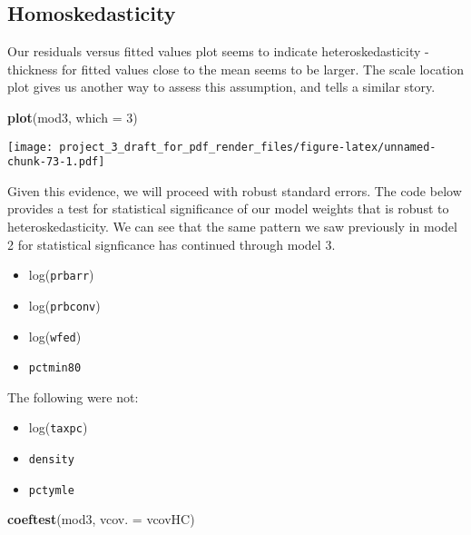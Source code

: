 \documentclass[]{article}
\newenvironment{Shaded}{\begin{snugshade}}{\end{snugshade}}
\newcommand{\DataTypeTok}[1]{\textcolor[rgb]{0.13,0.29,0.53}{#1}}
\newcommand{\DecValTok}[1]{\textcolor[rgb]{0.00,0.00,0.81}{#1}}
\newcommand{\KeywordTok}[1]{\textcolor[rgb]{0.13,0.29,0.53}{\textbf{#1}}}
\newcommand{\NormalTok}[1]{#1}
\providecommand{\tightlist}{%
  \setlength{\itemsep}{0pt}\setlength{\parskip}{0pt}}
\begin{document}
\hypertarget{homoskedasticity}{%
\subsection{Homoskedasticity}\label{homoskedasticity}}

Our residuals versus fitted values plot seems to indicate
heteroskedasticity - thickness for fitted values close to the mean seems
to be larger. The scale location plot gives us another way to assess
this assumption, and tells a similar story.

\begin{Shaded}
\begin{Highlighting}[]
\KeywordTok{plot}\NormalTok{(mod3, }\DataTypeTok{which =} \DecValTok{3}\NormalTok{)}
\end{Highlighting}
\end{Shaded}

\texttt{[image: project\_3\_draft\_for\_pdf\_render\_files/figure-latex/unnamed-chunk-73-1.pdf]}

Given this evidence, we will proceed with robust standard errors. The
code below provides a test for statistical significance of our model
weights that is robust to heteroskedasticity. We can see that the same
pattern we saw previously in model 2 for statistical signficance has
continued through model 3.

\begin{itemize}
\tightlist
\item
  log(\texttt{prbarr})
\item
  log(\texttt{prbconv})
\item
  log(\texttt{wfed})
\item
  \texttt{pctmin80}
\end{itemize}

The following were not:

\begin{itemize}
\tightlist
\item
  log(\texttt{taxpc})
\item
  \texttt{density}
\item
  \texttt{pctymle}
\end{itemize}

\begin{Shaded}
\begin{Highlighting}[]
\KeywordTok{coeftest}\NormalTok{(mod3, }\DataTypeTok{vcov. =}\NormalTok{ vcovHC)}
\end{Highlighting}
\end{Shaded}
\end{document}
